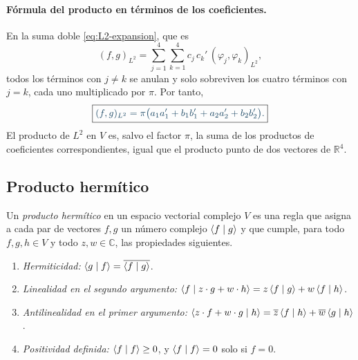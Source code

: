 \paragraph{Fórmula del producto en términos de los coeficientes.}
En la suma doble \eqref{eq:L2-expansion}, que es
\begin{equation*}
(f,g)_{L^2}=\sum_{j=1}^4\sum_{k=1}^4 c_j\,c_k'\,(\varphi_j,\varphi_k)_{L^2},
\end{equation*}
todos los términos con $j\ne k$ se anulan y solo
sobreviven los cuatro términos con $j=k$, cada uno multiplicado por $\pi$. Por tanto,
\begin{equation}\label{eq:L2-formula}
  \destacado{\Lp fg=\pi\bigl(a_1a_1'+b_1b_1'+a_2a_2'+b_2b_2'\bigr).}
\end{equation}
El producto de $L^2$ en $V$ es, salvo el factor $\pi$, la suma de los productos de
coeficientes correspondientes, igual que el producto punto de dos vectores de
$\mathbb R^4$.

\subsection*{Producto hermítico}

\begin{definicionT}
Un \emph{producto hermítico} en un espacio vectorial complejo $V$ es una regla que asigna a
cada par de vectores $f,g$ un número complejo $\langle f\mid g\rangle$ y que cumple, para todo $f,g,h\in V$ y
todo $z,w\in\mathbb C$, las propiedades siguientes.
\begin{enumerate}
  \item[(H1)] \emph{Hermiticidad:} $\langle g\mid f\rangle=\overline{\langle f\mid g\rangle}$.
  \item[(H2)] \emph{Linealidad en el segundo argumento:}
  $\langle f\mid z\cdot g+w\cdot h\rangle=z\,\langle f\mid g\rangle+w\,\langle f\mid h\rangle$.
  \item[(H3)] \emph{Antilinealidad en el primer argumento:}
  $\langle z\cdot f+w\cdot g\mid h\rangle=\overline z\,\langle f\mid h\rangle+\overline w\,\langle g\mid h\rangle$.
  \item[(H4)] \emph{Positividad definida:} $\langle f\mid f\rangle\ge 0$, y $\langle f\mid f\rangle=0$ solo si $f=0$.
\end{enumerate}
\end{definicionT}

